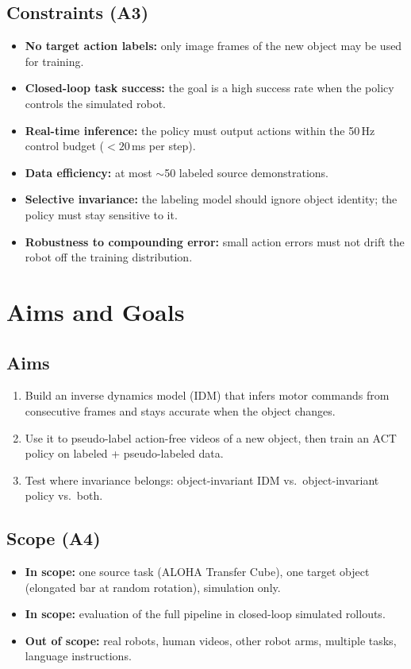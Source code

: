 \documentclass[11pt]{article}
\begin{document}
\subsection{Constraints (A3)}
\begin{itemize}
  \item \textbf{No target action labels:} only image frames of the new object
    may be used for training.
  \item \textbf{Closed-loop task success:} the goal is a high success rate when
    the policy controls the simulated robot.
  \item \textbf{Real-time inference:} the policy must output actions within the
    50\,Hz control budget ($<20$\,ms per step).
  \item \textbf{Data efficiency:} at most $\sim$50 labeled source
    demonstrations.
  \item \textbf{Selective invariance:} the labeling model should ignore object
    identity; the policy must stay sensitive to it.
  \item \textbf{Robustness to compounding error:} small action errors must not
    drift the robot off the training distribution.
\end{itemize}

\section{Aims and Goals}

\subsection{Aims}
\begin{enumerate}[label=\textbf{Aim \arabic*:}, leftmargin=4.2em]
  \item Build an inverse dynamics model (IDM) that infers motor commands from
    consecutive frames and stays accurate when the object changes.
  \item Use it to pseudo-label action-free videos of a new object, then train
    an ACT policy on labeled + pseudo-labeled data.
  \item Test where invariance belongs: object-invariant IDM vs.\
    object-invariant policy vs.\ both.
\end{enumerate}

\subsection{Scope (A4)}
\begin{itemize}
  \item \textbf{In scope:} one source task (ALOHA Transfer Cube), one target
    object (elongated bar at random rotation), simulation only.
  \item \textbf{In scope:} evaluation of the full pipeline in closed-loop
    simulated rollouts.
  \item \textbf{Out of scope:} real robots, human videos, other robot arms,
    multiple tasks, language instructions.
\end{itemize}
\end{document}
